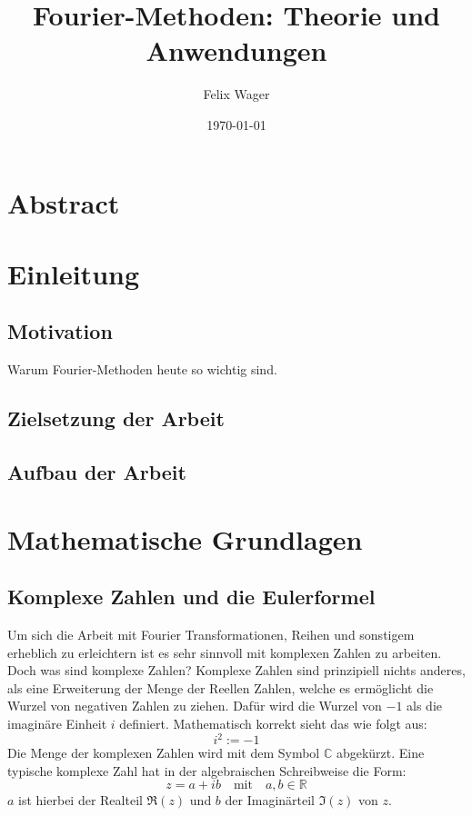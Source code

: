 \documentclass[a4paper,12pt]{article}
\title{Fourier-Methoden: Theorie und Anwendungen}
\author{Felix Wager}
\date{\today}
\theoremstyle{definition}
\theoremstyle{remark}
\begin{document}

\maketitle

\renewcommand{\contentsname}{Inhaltsverzeichnis}
\tableofcontents
\newpage


\section{Abstract}

\section{Einleitung}
\subsection{Motivation}
Warum Fourier-Methoden heute so wichtig sind.
\subsection{Zielsetzung der Arbeit}
\subsection{Aufbau der Arbeit}

\section{Mathematische Grundlagen}
\subsection{Komplexe Zahlen und die Eulerformel}
Um sich die Arbeit mit Fourier Transformationen, Reihen und sonstigem erheblich zu erleichtern ist es sehr sinnvoll mit komplexen Zahlen zu arbeiten. Doch was sind komplexe Zahlen? 
Komplexe Zahlen sind prinzipiell nichts anderes, als eine Erweiterung der Menge der Reellen Zahlen, welche es ermöglicht die Wurzel von negativen Zahlen zu ziehen. Dafür wird die Wurzel von $-1$ als die imaginäre Einheit $i$ definiert. Mathematisch korrekt sieht das wie folgt aus:
$$i^2 := -1$$
Die Menge der komplexen Zahlen wird mit dem Symbol $\mathbb{C}$ abgekürzt. Eine typische komplexe Zahl hat in der algebraischen Schreibweise die Form:
$$ z = a + ib \quad \text{mit} \quad a,b \in \mathbb{R} $$
$a$ ist hierbei der Realteil $\Re(z)$ und $b$ der Imaginärteil $\Im(z)$ von $z$. \vspace{1em}
\end{document}
